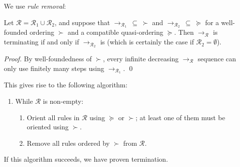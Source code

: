 \documentclass[runningheads,a4paper]{llncs}
\newcommand{\Rules}{\mathcal{R}}
\newcommand{\arr}[1]{\to_{#1}}
\begin{document}
We use \emph{rule removal}:

\begin{theorem}
Let $\Rules = \Rules_1 \cup \Rules_2$, and suppose that $\arr{\Rules_1}\:
\subseteq\:\succ$ and $\arr{\Rules_2}\:\subseteq\:\succeq$ for a
well-founded ordering $\succ$ and a compatible quasi-ordering $\succeq$.
Then $\arr{\Rules}$ is terminating if and only if $\arr{\Rules_2}$ is
(which is certainly the case if $\Rules_2 = \emptyset$).
\end{theorem}

\begin{proof}
By well-foundedness of $\succ$, every infinite decreasing $\arr{\Rules}$
sequence can only use finitely many steps using $\arr{\Rules_1}$.
\qed
\end{proof}

This gives rise to the following algorithm:
\begin{enumerate}
\item While $\Rules$ is non-empty:
  \begin{enumerate}
  \item Orient all rules in $\Rules$ using $\succeq$ or $\succ$; at least
    one of them must be oriented using $\succ$.
  \item Remove all rules ordered by $\succ$ from $\Rules$.
  \end{enumerate}
\end{enumerate}
If this algorithm succeeds, we have proven termination.
\end{document}
